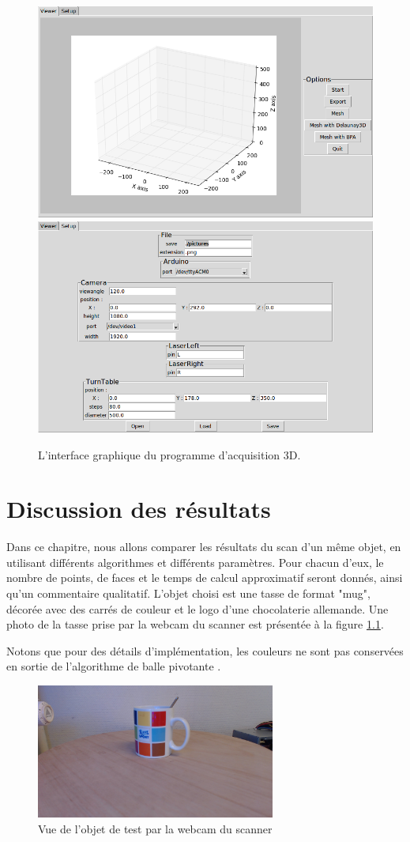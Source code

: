 \documentclass[a4paper,10pt]{report}
\begin{document}
\begin{figure}[h]
	\centering
    \includegraphics[width=.45\textwidth]{gui-viewer.png}
    \includegraphics[width=.45\textwidth]{gui-settings.png}
    \caption{\label{fig:gui} L'interface graphique du programme d'acquisition 3D.}
\end{figure}

\chapter{Discussion des résultats}

Dans ce chapitre, nous allons comparer les résultats du scan d'un même objet, en utilisant différents algorithmes et différents paramètres. Pour chacun d'eux, le nombre de points, de faces et le temps de calcul approximatif seront donnés, ainsi qu'un commentaire qualitatif. L'objet choisi est une tasse de format "mug", décorée avec des carrés de couleur et le logo d'une chocolaterie allemande. Une photo de la tasse prise par la webcam du scanner est présentée à la figure \ref{fig:camview}.

Notons que pour des détails d'implémentation, les couleurs ne sont pas conservées en sortie de l'algorithme de balle pivotante \cite{Digne}.

\begin{figure}[h!]
	\centering
	\includegraphics[width=0.7\textwidth]{results/camview.png}
	\caption{\label{fig:camview} Vue de l'objet de test par la webcam du scanner}
\end{figure}
\end{document}
